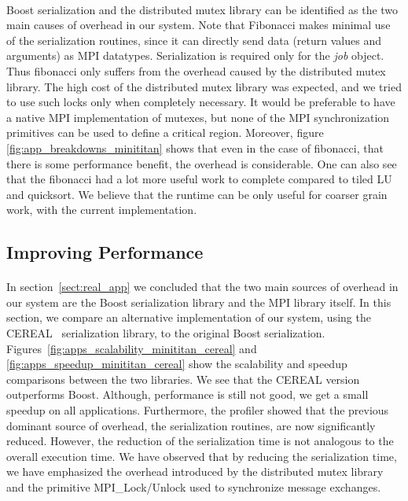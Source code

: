 \paragraph{}
Boost serialization and the distributed mutex library can be identified as the two main causes of overhead in our system.    
Note that Fibonacci makes minimal use of the serialization routines, since it can directly send data (return values and 
arguments) as MPI datatypes.  Serialization is required only for the \emph{job} object.  Thus fibonacci only suffers from
the overhead caused by the distributed mutex library.  The high cost of the distributed mutex library was expected, and we
tried to use such locks only when completely necessary.  It would be preferable to have a native MPI implementation of 
mutexes, but none of the MPI synchronization primitives can be used to define a critical region.  Moreover, figure 
\ref{fig:app_breakdowns_minititan} shows that even in the case of fibonacci, 
that there is some performance benefit, the overhead is
considerable.  One can also see that the fibonacci had a lot more useful work to complete compared to tiled LU and 
quicksort.  We believe that the runtime can be only useful for coarser grain work, with the current implementation.

\subsection{Improving Performance}
\paragraph{}
	In section~\ref{sect:real_app} we concluded that the two main sources of overhead in our system are the Boost 
serialization library and the MPI library itself.  In this section, we compare an alternative implementation of
our system, using the CEREAL~\cite{Cereal:Serialization} serialization library, to the original Boost serialization.  
Figures~\ref{fig:apps_scalability_minititan_cereal} and \ref{fig:apps_speedup_minititan_cereal} show the
scalability and speedup comparisons between the two libraries.  We see that the CEREAL version outperforms Boost.
Although, performance is still not good, we get a small speedup on all applications.  Furthermore, the profiler
showed that the previous dominant source of overhead, the serialization routines, are now significantly reduced.
However, the reduction of the serialization time is not analogous to the overall execution time.  
We have observed that by reducing the serialization time, we have emphasized the overhead introduced by the distributed 
mutex library and the primitive MPI\_Lock/Unlock used to synchronize message exchanges. 

